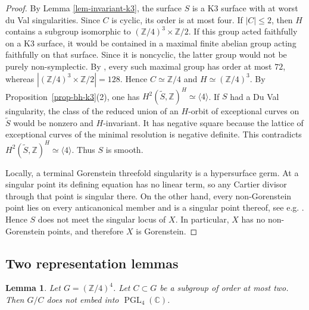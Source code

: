 \documentclass[10pt,oneside,reqno]{amsart}
\numberwithin{equation}{section}
\newtheorem{lemma}[theorem]{Lemma}
\theoremstyle{definition}
\newcommand{\Z}{\mathbb Z}
\newcommand{\C}{\mathbb C}
\begin{document}
\begin{proof}
By Lemma \ref{lem-invariant-k3}, the surface $S$ is a K3 surface with at worst du Val singularities. 
Since $C$ is cyclic, its order is at most four.  If $|C|\leq2$,
then $H$ contains a subgroup isomorphic to
$(\Z/4)^3\times\Z/2$.  If this group acted faithfully on a K3 surface,
it would be contained in a maximal finite abelian group acting
faithfully on that surface.  Since it is noncyclic, the latter group
would not be purely non-symplectic.  By \cite[Theorem~3.7]{LPZ}, every
such maximal group has order at most $72$, whereas
$|(\Z/4)^3\times\Z/2|=128$.  Hence
$C\simeq\Z/4$ and $H\simeq(\Z/4)^3$.
By Proposition~\ref{prop-bh-k3}(2), one has
$H^2(\widetilde S,\Z)^H\simeq\langle4\rangle$.
If $S$ had a Du Val
singularity, the class of the reduced union of an $H$-orbit of
exceptional curves on $\widetilde S$ would be nonzero and
$H$-invariant.  It has negative square because the lattice of exceptional curves
of the minimal resolution is negative definite.  This contradicts $H^2(\widetilde S,\Z)^H\simeq\langle4\rangle$. Thus $S$ is smooth. 

 Locally, a terminal Gorenstein threefold
singularity is a hypersurface germ.  At a singular point its defining
equation has no linear term, so any
Cartier divisor through that point is singular there.  On the other
hand, every non-Gorenstein point lies on every
anticanonical member and is a singular point thereof, see e.g.
\cite[Lemma~5.5]{LPZ}.  Hence $S$ does not meet the singular locus of
$X$.  In particular, $X$ has no non-Gorenstein points, and therefore
$X$ is Gorenstein.
\end{proof}

\subsection{Two representation lemmas}

\begin{lemma}
\label{lem-pgl4}
Let $G=(\mathbb{Z}/4)^4$.
Let $C\subset G$ be a subgroup of order at most two.  Then $G/C$ does not embed
into $\operatorname{PGL}_4(\C)$.
\end{lemma}
\end{document}
